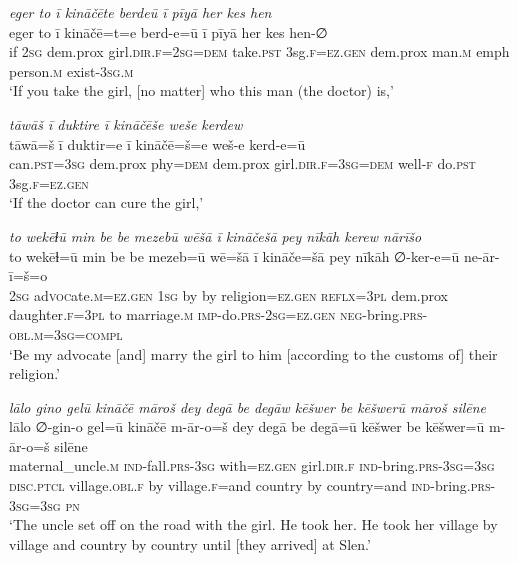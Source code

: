 \ea \label{ŽP.163}
\textit{eger to ī kināčēte berdeū ī pīyā her kes hen} \\ 
\gll eger to ī kināčē=t=e berd-e=ū ī pīyā her kes hen-∅ \\ 
 if \textsc{2sg} dem.prox girl\textsc{.dir}\textsc{.f}\textsc{=\textsc{2sg}}\textsc{=dem} take\textsc{.pst} 3sg\textsc{.f}\textsc{\textsc{=ez.gen}} dem.prox man\textsc{.m} emph person\textsc{.m} exist\textsc{-3sg}\textsc{.m} \\ 
\glt `If you take the girl, [no matter] who this man (the doctor) is,'
\z 
 
\ea \label{ŽP.164}
\textit{tāwāš ī duktire ī kināčēše weše kerdew} \\ 
\gll tāwā=š ī duktir=e ī kināčē=š=e weš-e kerd-e=ū \\ 
 can\textsc{.pst}\textsc{=3sg} dem.prox phy\textsc{=dem} dem.prox girl\textsc{.dir}\textsc{.f}\textsc{=3sg}\textsc{=dem} well\textsc{-f} do\textsc{.pst} 3sg\textsc{.f}\textsc{\textsc{=ez.gen}} \\ 
\glt `If the doctor can cure the girl,'
\z 
 
\ea \label{ŽP.165}
\textit{to wekēɫū min be be mezebū wēšā ī kināčešā pey nīkāh kerew nārīšo} \\ 
\gll to wekēɫ=ū min be be mezeb=ū wē=šā ī kināče=šā pey nīkāh ∅-ker-e=ū ne-ār-ī=š=o \\ 
 \textsc{2sg} ad\textsc{voc}ate\textsc{.m}\textsc{\textsc{=ez.gen}} \textsc{1sg} by by religion\textsc{\textsc{=ez.gen}} \textsc{reflx}\textsc{=3pl} dem.prox daughter\textsc{.f}\textsc{=3pl} to marriage\textsc{.m} \textsc{imp-}do\textsc{.prs}-\textsc{2sg}\textsc{\textsc{=ez.gen}} \textsc{neg-}bring\textsc{.prs}\textsc{-obl}\textsc{.m}\textsc{=3sg}\textsc{=compl} \\ 
\glt `Be my advocate [and] marry the girl to him [according to the customs of] their religion.'
\z 
 
\ea \label{ŽP.166}
\textit{lālo gino gelū kināčē māroš dey degā be degāw kēšwer be kēšwerū māroš silēne} \\ 
\gll lālo ∅-gin-o gel=ū kināčē m-ār-o=š dey degā be degā=ū kēšwer be kēšwer=ū m-ār-o=š silēne \\ 
 maternal\_uncle\textsc{.m} \textsc{ind-}fall\textsc{.prs}\textsc{-3sg} with\textsc{\textsc{=ez.gen}} girl\textsc{.dir}\textsc{.f} \textsc{ind-}bring\textsc{.prs}\textsc{-3sg}\textsc{=3sg} \textsc{disc.ptcl} village\textsc{.obl}\textsc{.f} by village\textsc{.f}=and country by country=and \textsc{ind-}bring\textsc{.prs}\textsc{-3sg}\textsc{=3sg} \textsc{pn} \\ 
\glt `The uncle set off on the road with the girl. He took her. He took her village by village and country by country until [they arrived] at Slen.'
\z 
 
